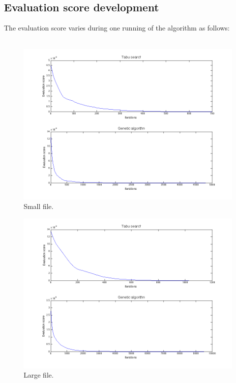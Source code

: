 \documentclass[titlepage,a4paper]{article}
\begin{document}
\subsection{Evaluation score development}
The evaluation score varies during one running of the algorithm as follows: \\\\
\begin{figure}[H]
  \centerline{\includegraphics[scale=0.5]{../results/figures/plot_small.png}}
  \caption{Small file.}
  \label{plot_small}
\end{figure}

\begin{figure}[H]
  \centerline{\includegraphics[scale=0.5]{../results/figures/plot_medium.png}}
  \caption{Large file.}
  \label{plot_large}
\end{figure}
\end{document}
